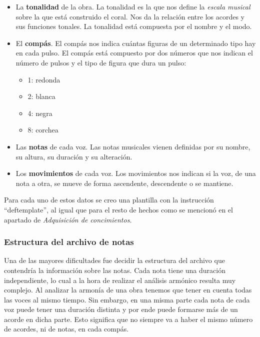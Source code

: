 \begin{itemize}

	\item La \textbf{tonalidad} de la obra. La tonalidad es la que nos define la \textit{escala musical} sobre la que está construido el coral. Nos da la relación entre los acordes y sus funciones tonales. La tonalidad está compuesta por el nombre y el modo.

	\item El \textbf{compás}. El compás nos indica cuántas figuras de un determinado tipo hay en cada pulso. El compás está compuesto por dos números que nos indican el número de pulsos y el tipo de figura que dura un pulso:

	\begin{itemize}
		\item 1: redonda
		\item 2: blanca
		\item 4: negra
		\item 8: corchea
	\end{itemize}

	\item Las \textbf{notas} de cada voz. Las notas musicales vienen definidas por su nombre, su altura, su duración y su alteración.

	\item Los \textbf{movimientos} de cada voz. Los movimientos nos indican si la voz, de una nota a otra, se mueve de forma ascendente, descendente o se mantiene.

\end{itemize}

Para cada uno de estos datos se creo una plantilla con la instrucción ``deftemplate'', al igual que para el resto de hechos como se mencionó en el apartado de \textit{Adquisición de concimientos}. 

\subsubsection{Estructura del archivo de notas}

Una de las mayores dificultades fue decidir la estructura del archivo que contendría la información sobre las notas. Cada nota tiene una duración independiente, lo cual a la hora de realizar el análisis armónico resulta muy complejo. Al analizar la armonía de una obra tenemos que tener en cuenta todas las voces al mismo tiempo. Sin embargo, en una misma parte cada nota de cada voz puede tener una duración distinta y por ende puede formarse más de un acorde en dicha parte. Esto significa que no siempre va a haber el mismo número de acordes, ni de notas, en cada compás.

